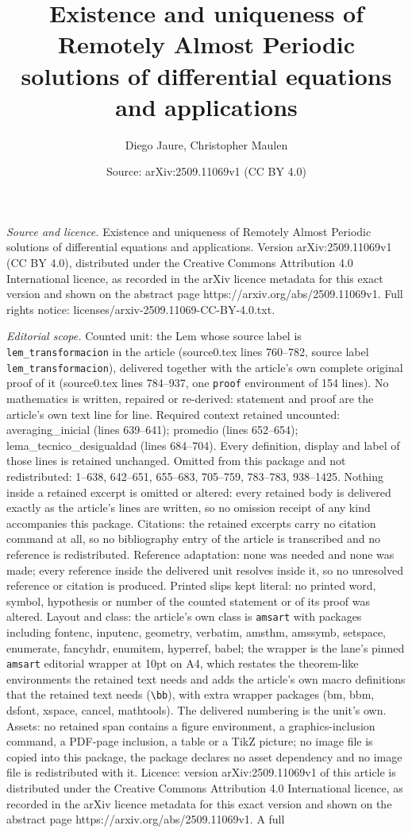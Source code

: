 \documentclass[10pt,a4paper]{amsart}
\title[Existence and uniqueness of Remotely Almost Periodic solutio]{Existence and uniqueness of Remotely Almost Periodic solutions of differential equations and applications}
\author{Diego Jaure, Christopher Maulen}
\date{Source: arXiv:2509.11069v1 (CC BY 4.0)}
\begin{document}
\maketitle

\noindent\emph{Source and licence.} Existence and uniqueness of Remotely Almost Periodic solutions of differential equations and applications. Version arXiv:2509.11069v1 (CC BY 4.0), distributed under the Creative Commons Attribution 4.0 International licence, as recorded in the arXiv licence metadata for this exact version and shown on the abstract page https://arxiv.org/abs/2509.11069v1. Full rights notice: licenses/arxiv-2509.11069-CC-BY-4.0.txt.\par\smallskip

\noindent\textit{Editorial scope.} Counted unit: the Lem whose source label is \texttt{lem\_transformacion} in the article (source0.tex lines 760--782, source label \texttt{lem\_transformacion}), delivered together with the article's own complete original proof of it (source0.tex lines 784--937, one \texttt{proof} environment of 154 lines). No mathematics is written, repaired or re-derived: statement and proof are the article's own text line for line. Required context retained uncounted: averaging\_inicial (lines 639--641); promedio (lines 652--654); lema\_tecnico\_desigualdad (lines 684--704). Every definition, display and label of those lines is retained unchanged. Omitted from this package and not redistributed: 1--638, 642--651, 655--683, 705--759, 783--783, 938--1425. Nothing inside a retained excerpt is omitted or altered: every retained body is delivered exactly as the article's lines are written, so no omission receipt of any kind accompanies this package. Citations: the retained excerpts carry no citation command at all, so no bibliography entry of the article is transcribed and no reference is redistributed. Reference adaptation: none was needed and none was made; every reference inside the delivered unit resolves inside it, so no unresolved reference or citation is produced. Printed slips kept literal: no printed word, symbol, hypothesis or number of the counted statement or of its proof was altered. Layout and class: the article's own class is \texttt{amsart} with packages including fontenc, inputenc, geometry, verbatim, amsthm, amssymb, setspace, enumerate, fancyhdr, enumitem, hyperref, babel; the wrapper is the lane's pinned \texttt{amsart} editorial wrapper at 10pt on A4, which restates the theorem-like environments the retained text needs and adds the article's own macro definitions that the retained text needs (\texttt{\textbackslash bb}), with extra wrapper packages (bm, bbm, dsfont, xspace, cancel, mathtools). The delivered numbering is the unit's own. Assets: no retained span contains a figure environment, a graphics-inclusion command, a PDF-page inclusion, a table or a TikZ picture; no image file is copied into this package, the package declares no asset dependency and no image file is redistributed with it. Licence: version arXiv:2509.11069v1 of this article is distributed under the Creative Commons Attribution 4.0 International licence, as recorded in the arXiv licence metadata for this exact version and shown on the abstract page https://arxiv.org/abs/2509.11069v1. A full 
\end{document}
